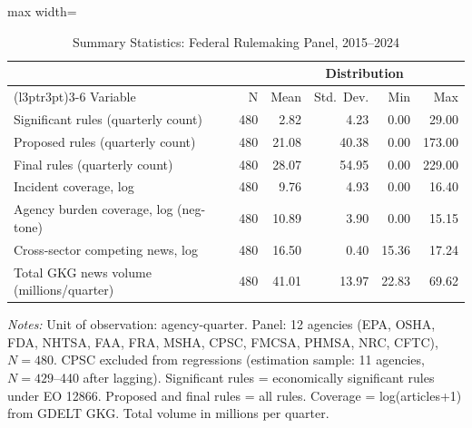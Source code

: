 \begin{table}[H]
\centering
\caption{\label{tab:tab:sumstats}Summary Statistics: Federal Rulemaking Panel, 2015--2024}
\begin{adjustbox}{max width=\textwidth}
\begin{threeparttable}
\begin{tabular}{lrrrrr}
\toprule
\multicolumn{1}{c}{ } & \multicolumn{1}{c}{ } & \multicolumn{4}{c}{Distribution} \\
\cmidrule(l{3pt}r{3pt}){3-6}
Variable & N & Mean & Std.\ Dev. & Min & Max\\
\midrule
Significant rules (quarterly count) & 480 & 2.82 & 4.23 & 0.00 & 29.00\\
Proposed rules (quarterly count) & 480 & 21.08 & 40.38 & 0.00 & 173.00\\
Final rules (quarterly count) & 480 & 28.07 & 54.95 & 0.00 & 229.00\\
Incident coverage, log & 480 & 9.76 & 4.93 & 0.00 & 16.40\\
Agency burden coverage, log (neg-tone) & 480 & 10.89 & 3.90 & 0.00 & 15.15\\
\addlinespace
Cross-sector competing news, log & 480 & 16.50 & 0.40 & 15.36 & 17.24\\
Total GKG news volume (millions/quarter) & 480 & 41.01 & 13.97 & 22.83 & 69.62\\
\bottomrule
\end{tabular}
\begin{tablenotes}
\small
\item \textit{Notes:} Unit of observation: agency-quarter. Panel: 12 agencies (EPA, OSHA, FDA, NHTSA, FAA, FRA, MSHA, CPSC, FMCSA, PHMSA, NRC, CFTC), $N=480$. CPSC excluded from regressions (estimation sample: 11 agencies, $N=429$--440 after lagging). Significant rules = economically significant rules under EO 12866. Proposed and final rules = all rules. Coverage = log(articles+1) from GDELT GKG. Total volume in millions per quarter.
\end{tablenotes}
\end{threeparttable}
\end{adjustbox}
\end{table}
